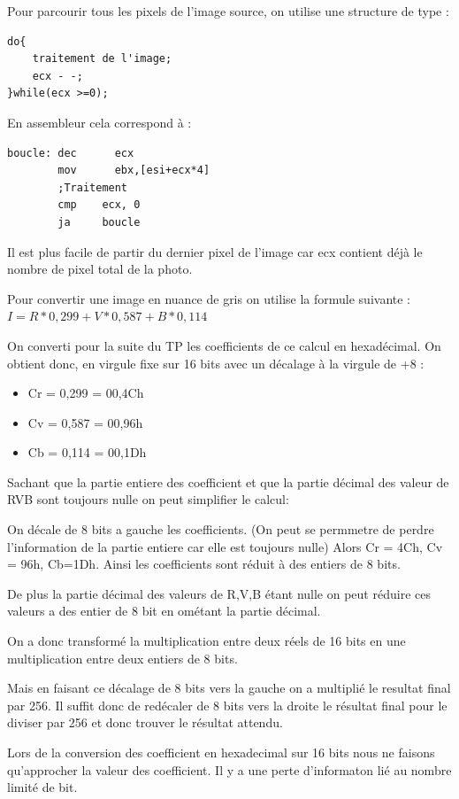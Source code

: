 \documentclass[11pt]{report}
\begin{document}
Pour parcourir tous les pixels de l'image source, on utilise une structure de type :
\begin{lstlisting}
do{
	traitement de l'image;
	ecx - -;
}while(ecx >=0);
\end{lstlisting}
\medskip

En assembleur cela correspond à :

\begin{lstlisting}
boucle: dec      ecx
        mov		 ebx,[esi+ecx*4]
        ;Traitement
        cmp    ecx, 0
        ja     boucle
\end{lstlisting}

Il est plus facile de partir du dernier pixel de l'image car ecx contient déjà le nombre de pixel total de la photo.

Pour convertir une image en nuance de gris on utilise la formule suivante :
$I=R*0,299+V*0,587+B*0,114$

On converti pour la suite du TP les coefficients de ce calcul en hexadécimal.
On obtient donc, en virgule fixe sur 16 bits avec un décalage à la virgule de +8 :
\begin{itemize}
\item  Cr = 0,299 =  00,4Ch
\item  Cv = 0,587 = 00,96h
\item  Cb = 0,114 = 00,1Dh
\end{itemize}

Sachant que la partie entiere des coefficient et que la partie décimal des valeur de RVB sont toujours nulle on peut simplifier le calcul:

On décale de 8 bits a gauche les coefficients. (On peut se permmetre de perdre l'information de la partie entiere car elle est toujours nulle)
Alors Cr = 4Ch, Cv = 96h, Cb=1Dh.
Ainsi les coefficients sont réduit à des entiers de 8 bits.

De plus la partie décimal des valeurs de R,V,B étant nulle on peut réduire ces valeurs a des entier de 8 bit en ométant la partie décimal.

On a donc transformé la multiplication entre deux réels de 16 bits en une multiplication entre deux entiers de 8 bits.

Mais en faisant ce décalage de 8 bits vers la gauche on a multiplié le resultat final par 256.
Il suffit donc de redécaler de 8 bits vers la droite le résultat final pour le diviser par 256 et donc trouver le résultat attendu.


Lors de la conversion des coefficient en hexadecimal sur 16 bits nous ne faisons qu'approcher la valeur des coefficient. Il y a une perte d'informaton lié au nombre limité de bit.
\end{document}
